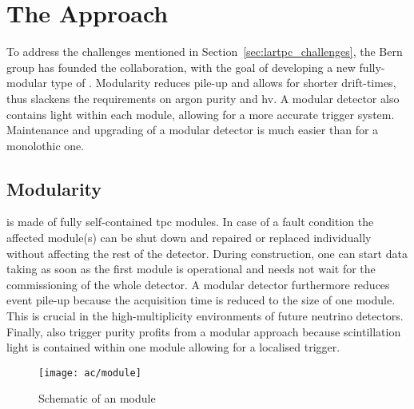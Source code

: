\section{The \AC{} Approach}
\label{sec:ac_argoncube}

To address the challenges mentioned in Section~\ref{sec:lartpc_challenges}, the Bern group has founded the \AC{} collaboration, with the goal of developing a new fully-modular type of \lartpc{}.
Modularity reduces pile-up and allows for shorter drift-times, thus slackens the requirements on argon purity and \gls{hv}.
A modular detector also contains light within each module, allowing for a more accurate trigger system.
Maintenance and upgrading of a modular detector is much easier than for a monolothic one.


\subsection{Modularity}
\label{sec:ac_argoncube_mod}

\AC{} is made of fully self-contained \gls{tpc} modules.
In case of a fault condition the affected module(s) can be shut down and repaired or replaced individually without affecting the rest of the detector.
During construction, one can start data taking as soon as the first module is operational and needs not wait for the commissioning of the whole detector.
A modular detector furthermore reduces event pile-up because the acquisition time is reduced to the size of one module.
This is crucial in the high-multiplicity environments of future \lar{} neutrino detectors.
Finally, also trigger purity profits from a modular approach because scintillation light is contained within one module allowing for a localised trigger.

\begin{figure}[htb]
	\centering
	\texttt{[image: ac/module]}
	\caption{Schematic of an \AC{} module}
	\label{fig:ac_module}
\end{figure}

